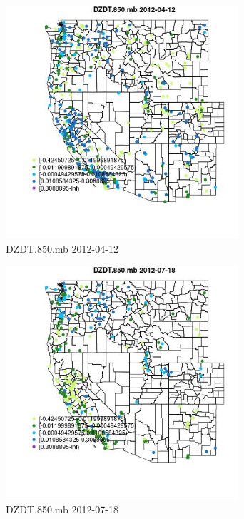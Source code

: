 \begin{figure} 
\centering  
\includegraphics[width=0.77\textwidth]{Code_Outputs/Report_ML_input_PM25_Step4_part_e_de_duplicated_aves_compiled_2019-05-14wNAs_MapObsDZDT850mb2012-04-12.jpg} 
\caption{\label{fig:Report_ML_input_PM25_Step4_part_e_de_duplicated_aves_compiled_2019-05-14wNAsMapObsDZDT850mb2012-04-12}DZDT.850.mb 2012-04-12} 
\end{figure} 
 

\begin{figure} 
\centering  
\includegraphics[width=0.77\textwidth]{Code_Outputs/Report_ML_input_PM25_Step4_part_e_de_duplicated_aves_compiled_2019-05-14wNAs_MapObsDZDT850mb2012-07-18.jpg} 
\caption{\label{fig:Report_ML_input_PM25_Step4_part_e_de_duplicated_aves_compiled_2019-05-14wNAsMapObsDZDT850mb2012-07-18}DZDT.850.mb 2012-07-18} 
\end{figure} 
 

